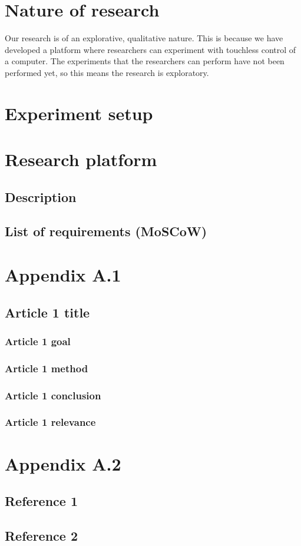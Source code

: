 \documentclass[a4paper]{article}
\begin{document}
  \section{Nature of research}
  Our research is of an explorative, qualitative nature. This is because we
  have developed a platform where researchers can experiment with touchless
  control of a computer. The experiments that the researchers can perform have
  not been performed yet, so this means the research is exploratory.
  \clearpage

  \section{Experiment setup}
  \clearpage

  \section{Research platform}
  \subsection{Description}
  \subsection{List of requirements (MoSCoW)}
  \clearpage

  \section{Appendix A.1} %

  \subsection{Article 1 title}
  \subsubsection{Article 1 goal}
  \subsubsection{Article 1 method}
  \subsubsection{Article 1 conclusion}
  \subsubsection{Article 1 relevance}
  \clearpage
  

  \section{Appendix A.2} %
  \subsection{Reference 1}
  \subsection{Reference 2}
  \clearpage
\end{document}
